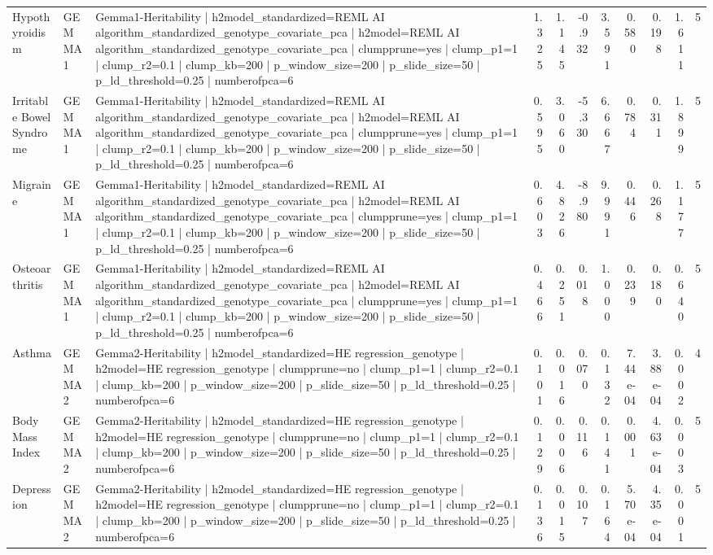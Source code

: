 \begin{landscape}
\begin{longtable}{p{2.4cm}p{1.8cm}p{6.0cm}rrrrrrrr}
Hypothyroidism & GEMMA1 & Gemma1-Heritability | h2model\_standardized=REML AI algorithm\_standardized\_genotype\_covariate\_pca | h2model=REML AI algorithm\_standardized\_genotype\_covariate\_pca | clumpprune=yes | clump\_p1=1 | clump\_r2=0.1 | clump\_kb=200 | p\_window\_size=200 | p\_slide\_size=50 | p\_ld\_threshold=0.25 | numberofpca=6 & 1.325 & 1.145 & -0.932 & 3.591 & 0.580 & 0.198 & 1.611 & 5 \\
Irritable Bowel Syndrome & GEMMA1 & Gemma1-Heritability | h2model\_standardized=REML AI algorithm\_standardized\_genotype\_covariate\_pca | h2model=REML AI algorithm\_standardized\_genotype\_covariate\_pca | clumpprune=yes | clump\_p1=1 | clump\_r2=0.1 | clump\_kb=200 | p\_window\_size=200 | p\_slide\_size=50 | p\_ld\_threshold=0.25 | numberofpca=6 & 0.595 & 3.060 & -5.330 & 6.667 & 0.784 & 0.311 & 1.899 & 5 \\
Migraine & GEMMA1 & Gemma1-Heritability | h2model\_standardized=REML AI algorithm\_standardized\_genotype\_covariate\_pca | h2model=REML AI algorithm\_standardized\_genotype\_covariate\_pca | clumpprune=yes | clump\_p1=1 | clump\_r2=0.1 | clump\_kb=200 | p\_window\_size=200 | p\_slide\_size=50 | p\_ld\_threshold=0.25 | numberofpca=6 & 0.603 & 4.826 & -8.980 & 9.991 & 0.446 & 0.268 & 1.177 & 5 \\
Osteoarthritis & GEMMA1 & Gemma1-Heritability | h2model\_standardized=REML AI algorithm\_standardized\_genotype\_covariate\_pca | h2model=REML AI algorithm\_standardized\_genotype\_covariate\_pca | clumpprune=yes | clump\_p1=1 | clump\_r2=0.1 | clump\_kb=200 | p\_window\_size=200 | p\_slide\_size=50 | p\_ld\_threshold=0.25 | numberofpca=6 & 0.466 & 0.251 & 0.018 & 1.000 & 0.239 & 0.180 & 0.640 & 5 \\
Asthma & GEMMA2 & Gemma2-Heritability | h2model\_standardized=HE regression\_genotype | h2model=HE regression\_genotype | clumpprune=no | clump\_p1=1 | clump\_r2=0.1 | clump\_kb=200 | p\_window\_size=200 | p\_slide\_size=50 | p\_ld\_threshold=0.25 | numberofpca=6 & 0.101 & 0.016 & 0.070 & 0.132 & 7.44e-04 & 3.88e-04 & 0.002 & 4 \\
Body Mass Index & GEMMA2 & Gemma2-Heritability | h2model\_standardized=HE regression\_genotype | h2model=HE regression\_genotype | clumpprune=no | clump\_p1=1 | clump\_r2=0.1 | clump\_kb=200 | p\_window\_size=200 | p\_slide\_size=50 | p\_ld\_threshold=0.25 | numberofpca=6 & 0.129 & 0.006 & 0.116 & 0.141 & 0.001 & 4.63e-04 & 0.003 & 5 \\
Depression & GEMMA2 & Gemma2-Heritability | h2model\_standardized=HE regression\_genotype | h2model=HE regression\_genotype | clumpprune=no | clump\_p1=1 | clump\_r2=0.1 | clump\_kb=200 | p\_window\_size=200 | p\_slide\_size=50 | p\_ld\_threshold=0.25 | numberofpca=6 & 0.136 & 0.015 & 0.107 & 0.164 & 5.70e-04 & 4.35e-04 & 0.001 & 5 \\

\end{longtable}
\end{landscape}

